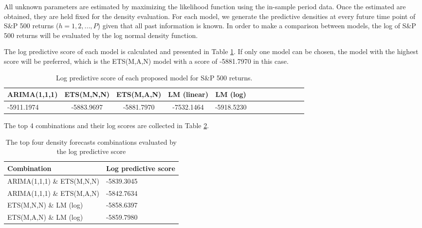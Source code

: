 \documentclass{monashthesis}
\begin{document}
All unknown parameters are estimated by maximizing the likelihood function using the in-sample period data. Once the estimated are obtained, they are held fixed for the density evaluation. For each model, we generate the predictive densities at every future time point of S\&P 500 returns (\(h=1,2,...,P\)) given that all past information is known. In order to make a comparison between models, the log of S\&P 500 returns will be evaluated by the log normal density function.

The log predictive score of each model is calculated and presented in Table \ref{tab:1}. If only one model can be chosen, the model with the highest score will be preferred, which is the ETS(M,A,N) model with a score of -5881.7970 in this case.

\vspace{0.3cm}

\begin{table}[htbp!]
\centering
\caption{Log predictive score of each proposed model for S\&P 500 returns.}
\begin{tabular}{l*{4}{c}cccccccc}
\hline
     ARIMA(1,1,1) & ETS(M,N,N) & ETS(M,A,N) & LM (linear) & LM (log) \\
    \hline
     -5911.1974 & -5883.9697  & -5881.7970 & -7532.1464 & -5918.5230\\
    \hline
\end{tabular}
\label{tab:1}
\end{table}

The top 4 combinations and their log scores are collected in Table \ref{tab:3}.

\begin{table}[ht]
  \centering
  \caption{The top four density forecasts combinations evaluated by the log predictive score}
    \begin{tabular}{ll}
    \toprule
    Combination & Log predictive score \\
    \midrule
    ARIMA(1,1,1) \& ETS(M,N,N) & -5839.3045 \\
    ARIMA(1,1,1) \& ETS(M,A,N) & -5842.7634 \\
    ETS(M,N,N) \&  LM (log) & -5858.6397 \\
    ETS(M,A,N) \&  LM (log) & -5859.7980 \\
    \bottomrule
    \end{tabular}
  \label{tab:3}
\end{table}

\printbibliography[title={Reference}]
\end{document}
